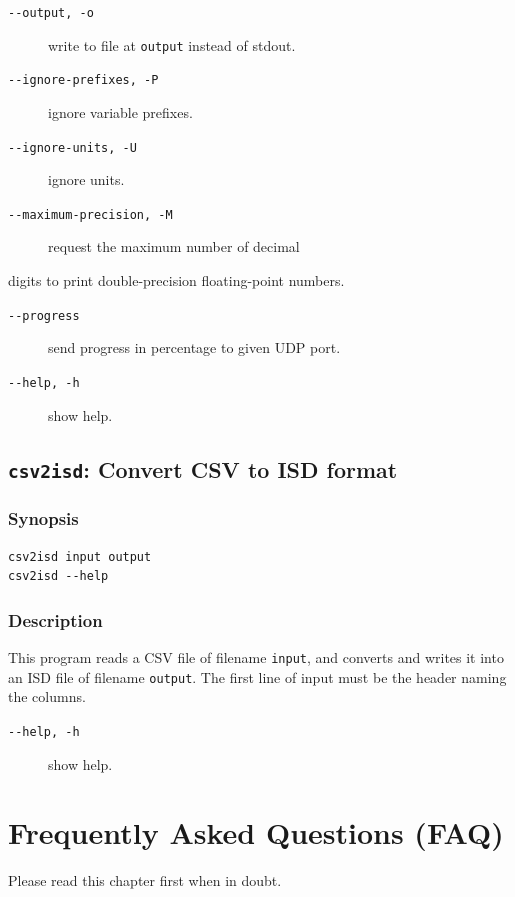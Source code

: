 \documentclass[a4paper,10pt]{report}
\begin{document}
\begin{description}
\item[{\texttt{-{}-output, -o}}] write to file at \texttt{output} instead of stdout.
\item[{\texttt{-{}-ignore-prefixes, -P}}] ignore variable prefixes.
\item[{\texttt{-{}-ignore-units, -U}}] ignore units.
\item[{\texttt{-{}-maximum-precision, -M}}] request the maximum number of decimal
\end{description}
digits to print double-precision floating-point numbers.
\begin{description}
\item[{\texttt{-{}-progress}}] send progress in percentage to given UDP port.
\item[{\texttt{-{}-help, -h}}] show help.
\end{description}

\section{\label{org9c04b0a} \texttt{csv2isd}: Convert CSV to ISD format}
\label{sec:org074cf63}

\subsection{Synopsis}
\label{sec:org58e1949}
\begin{verbatim}
csv2isd input output
csv2isd --help
\end{verbatim}

\subsection{Description}
\label{sec:org99ab42b}
This program reads a CSV file of filename \texttt{input}, and converts and writes
it into an ISD file of filename \texttt{output}.
The first line of input must be the header naming the columns.

\begin{description}
\item[{\texttt{-{}-help, -h}}] show help.
\end{description}

\chapter{Frequently Asked Questions (FAQ)}
\label{sec:org59476e9}
Please read this chapter first when in doubt.
\end{document}

